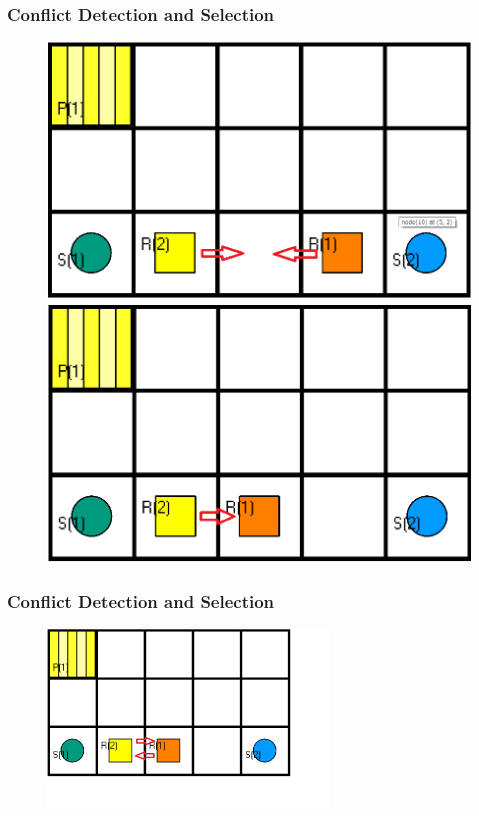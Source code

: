 \documentclass{beamer}
\begin{document}
\begin{frame}
\frametitle{Conflict Detection and Selection}
\begin{figure}
   \begin{minipage}[b]{.4\linewidth} 
      \includegraphics[width=\linewidth]{Images/Conflict 1_1}
   \end{minipage}
   \hspace{.1\linewidth}
   \begin{minipage}[b]{.4\linewidth} 
      \includegraphics[width=\linewidth]{Images/Conflict 1_2}
   \end{minipage}
\end{figure}
\end{frame}

\begin{frame}
\frametitle{Conflict Detection and Selection}
\begin{figure}
\includegraphics[width=75mm]{Images/Conflict 2}
\end{figure}
\end{frame}
\end{document}
